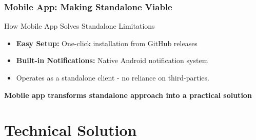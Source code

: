 \documentclass[aspectratio=169,11pt]{beamer}
\begin{document}
\begin{frame}
\frametitle{Mobile App: Making Standalone Viable}
\begin{block}{How Mobile App Solves Standalone Limitations}
\begin{itemize}
    \item \textbf{Easy Setup:} One-click installation from GitHub releases
    \item \textbf{Built-in Notifications:} Native Android notification system
    \item Operates as a standalone client - no reliance on third-parties.
\end{itemize}
\end{block}

\begin{center}
\textbf{Mobile app transforms standalone approach into a practical solution}
\end{center}
\end{frame}

\section{Technical Solution}
\end{document}
